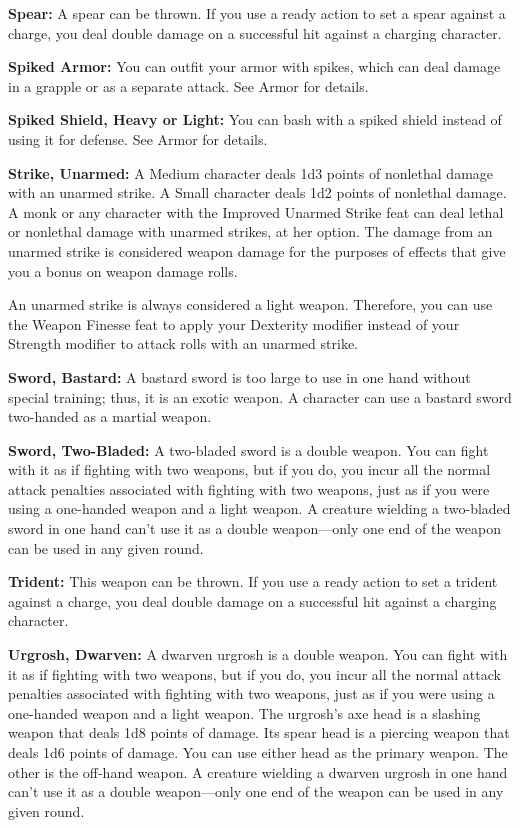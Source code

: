 \documentclass{article}
\begin{document}
\textbf{Spear:} A spear can be thrown. If you use a ready action to set a spear 
against a charge, you deal double damage on a successful hit against a charging 
character.

\textbf{Spiked Armor:} You can outfit your armor with spikes, which can deal damage 
in a grapple or as a separate attack. See Armor for details.

\textbf{Spiked Shield, Heavy or Light:} You can bash with a spiked shield instead 
of using it for defense. See Armor for details.

\textbf{Strike, Unarmed: }A Medium character deals 1d3 points of nonlethal damage 
with an unarmed strike. A Small character deals 1d2 points of nonlethal damage. 
A monk or any character with the Improved Unarmed Strike feat can deal lethal or 
nonlethal damage with unarmed strikes, at her option. The damage from an unarmed 
strike is considered weapon damage for the purposes of effects that give you a 
bonus on weapon damage rolls.

An unarmed strike is always considered a light weapon. Therefore, you can use the 
Weapon Finesse feat to apply your Dexterity modifier instead of your Strength modifier 
to attack rolls with an unarmed strike.

\textbf{Sword, Bastard:} A bastard sword is too large to use in one hand without 
special training; thus, it is an exotic weapon. A character can use a bastard sword 
two-handed as a martial weapon.

\textbf{Sword, Two-Bladed:} A two-bladed sword is a double weapon. You can fight 
with it as if fighting with two weapons, but if you do, you incur all the normal 
attack penalties associated with fighting with two weapons, just as if you were 
using a one-handed weapon and a light weapon. A creature wielding a two-bladed 
sword in one hand can't use it as a double weapon---only one end of the weapon 
can be used in any given round.

\textbf{Trident:} This weapon can be thrown. If you use a ready action to set a 
trident against a charge, you deal double damage on a successful hit against a 
charging character.

\textbf{Urgrosh, Dwarven:} A dwarven urgrosh is a double weapon. You can fight 
with it as if fighting with two weapons, but if you do, you incur all the normal 
attack penalties associated with fighting with two weapons, just as if you were 
using a one-handed weapon and a light weapon. The urgrosh's axe head is a slashing 
weapon that deals 1d8 points of damage. Its spear head is a piercing weapon that 
deals 1d6 points of damage. You can use either head as the primary weapon. The 
other is the off-hand weapon. A creature wielding a dwarven urgrosh in one hand 
can't use it as a double weapon---only one end of the weapon can be used in any 
given round.
\end{document}
